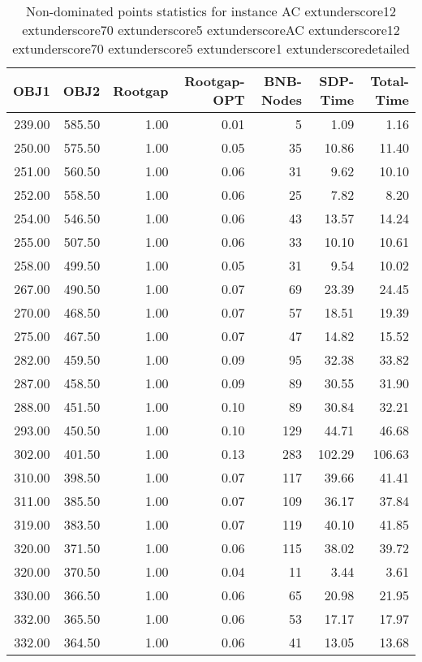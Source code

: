 \begin{table}
\caption{Non-dominated points statistics for instance AC	extunderscore12	extunderscore70	extunderscore5	extunderscoreAC	extunderscore12	extunderscore70	extunderscore5	extunderscore1	extunderscoredetailed}
\label{tab:stats/AC_12_70_5_AC_12_70_5_1_detailed}
\begin{tabular}{rrrrrrr}
\toprule
OBJ1 & OBJ2 & Rootgap & Rootgap-OPT & BNB-Nodes & SDP-Time & Total-Time \\
\midrule
239.00 & 585.50 & 1.00 & 0.01 & 5 & 1.09 & 1.16 \\
250.00 & 575.50 & 1.00 & 0.05 & 35 & 10.86 & 11.40 \\
251.00 & 560.50 & 1.00 & 0.06 & 31 & 9.62 & 10.10 \\
252.00 & 558.50 & 1.00 & 0.06 & 25 & 7.82 & 8.20 \\
254.00 & 546.50 & 1.00 & 0.06 & 43 & 13.57 & 14.24 \\
255.00 & 507.50 & 1.00 & 0.06 & 33 & 10.10 & 10.61 \\
258.00 & 499.50 & 1.00 & 0.05 & 31 & 9.54 & 10.02 \\
267.00 & 490.50 & 1.00 & 0.07 & 69 & 23.39 & 24.45 \\
270.00 & 468.50 & 1.00 & 0.07 & 57 & 18.51 & 19.39 \\
275.00 & 467.50 & 1.00 & 0.07 & 47 & 14.82 & 15.52 \\
282.00 & 459.50 & 1.00 & 0.09 & 95 & 32.38 & 33.82 \\
287.00 & 458.50 & 1.00 & 0.09 & 89 & 30.55 & 31.90 \\
288.00 & 451.50 & 1.00 & 0.10 & 89 & 30.84 & 32.21 \\
293.00 & 450.50 & 1.00 & 0.10 & 129 & 44.71 & 46.68 \\
302.00 & 401.50 & 1.00 & 0.13 & 283 & 102.29 & 106.63 \\
310.00 & 398.50 & 1.00 & 0.07 & 117 & 39.66 & 41.41 \\
311.00 & 385.50 & 1.00 & 0.07 & 109 & 36.17 & 37.84 \\
319.00 & 383.50 & 1.00 & 0.07 & 119 & 40.10 & 41.85 \\
320.00 & 371.50 & 1.00 & 0.06 & 115 & 38.02 & 39.72 \\
320.00 & 370.50 & 1.00 & 0.04 & 11 & 3.44 & 3.61 \\
330.00 & 366.50 & 1.00 & 0.06 & 65 & 20.98 & 21.95 \\
332.00 & 365.50 & 1.00 & 0.06 & 53 & 17.17 & 17.97 \\
332.00 & 364.50 & 1.00 & 0.06 & 41 & 13.05 & 13.68 \\

\end{tabular}
\end{table}
